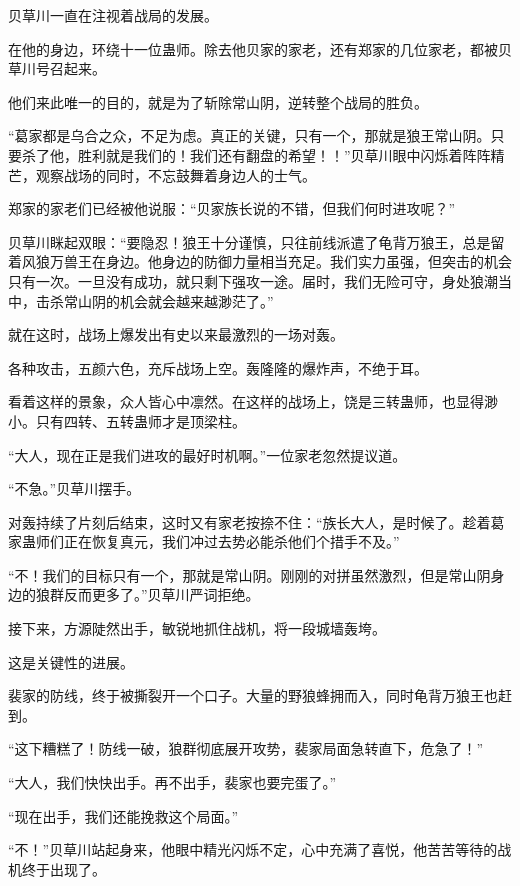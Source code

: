 
\begin{this_body}

贝草川一直在注视着战局的发展。

在他的身边，环绕十一位蛊师。除去他贝家的家老，还有郑家的几位家老，都被贝草川号召起来。

他们来此唯一的目的，就是为了斩除常山阴，逆转整个战局的胜负。

“葛家都是乌合之众，不足为虑。真正的关键，只有一个，那就是狼王常山阴。只要杀了他，胜利就是我们的！我们还有翻盘的希望！！”贝草川眼中闪烁着阵阵精芒，观察战场的同时，不忘鼓舞着身边人的士气。

郑家的家老们已经被他说服：“贝家族长说的不错，但我们何时进攻呢？”

贝草川眯起双眼：“要隐忍！狼王十分谨慎，只往前线派遣了龟背万狼王，总是留着风狼万兽王在身边。他身边的防御力量相当充足。我们实力虽强，但突击的机会只有一次。一旦没有成功，就只剩下强攻一途。届时，我们无险可守，身处狼潮当中，击杀常山阴的机会就会越来越渺茫了。”

就在这时，战场上爆发出有史以来最激烈的一场对轰。

各种攻击，五颜六色，充斥战场上空。轰隆隆的爆炸声，不绝于耳。

看着这样的景象，众人皆心中凛然。在这样的战场上，饶是三转蛊师，也显得渺小。只有四转、五转蛊师才是顶梁柱。

“大人，现在正是我们进攻的最好时机啊。”一位家老忽然提议道。

“不急。”贝草川摆手。

对轰持续了片刻后结束，这时又有家老按捺不住：“族长大人，是时候了。趁着葛家蛊师们正在恢复真元，我们冲过去势必能杀他们个措手不及。”

“不！我们的目标只有一个，那就是常山阴。刚刚的对拼虽然激烈，但是常山阴身边的狼群反而更多了。”贝草川严词拒绝。

接下来，方源陡然出手，敏锐地抓住战机，将一段城墙轰垮。

这是关键性的进展。

裴家的防线，终于被撕裂开一个口子。大量的野狼蜂拥而入，同时龟背万狼王也赶到。

“这下糟糕了！防线一破，狼群彻底展开攻势，裴家局面急转直下，危急了！”

“大人，我们快快出手。再不出手，裴家也要完蛋了。”

“现在出手，我们还能挽救这个局面。”

“不！”贝草川站起身来，他眼中精光闪烁不定，心中充满了喜悦，他苦苦等待的战机终于出现了。


\end{this_body}
